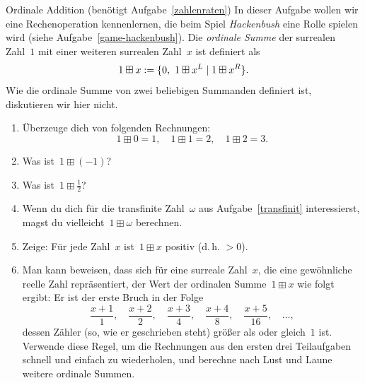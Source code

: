 \documentclass{zirkelblatt}
\begin{document}
\begin{aufgabe}{Ordinale Addition (benötigt Aufgabe~\ref{zahlenraten})}
\label{ordinale-addition}
In dieser Aufgabe wollen wir eine Rechenoperation
kennenlernen, die beim Spiel \emph{Hackenbush} eine Rolle spielen wird (siehe
Aufgabe~\ref{game-hackenbush}). Die \emph{ordinale Summe} der surrealen Zahl~$1$ mit
einer weiteren surrealen Zahl~$x$ ist definiert als
\[ 1 \boxplus x := \sur{0,\ 1 \boxplus x^L}{1 \boxplus x^R}. \]
Wie die ordinale Summe von zwei beliebigen Summanden definiert ist,
diskutieren wir hier nicht.
\begin{enumerate}
\item Überzeuge dich von folgenden Rechnungen:
\[ 1 \boxplus 0 = 1, \quad
  1 \boxplus 1 = 2, \quad
  1 \boxplus 2 = 3. \]
\item Was ist~$1 \boxplus (-1)$?
\item Was ist~$1 \boxplus \tfrac{1}{2}$?
\item Wenn du dich für die transfinite Zahl~$\omega$ aus
Aufgabe~\ref{transfinit} interessierst, magst du vielleicht~$1 \boxplus \omega$
berechnen.
\item Zeige: Für jede Zahl~$x$ ist~$1 \boxplus x$ positiv (d.\,h. $> 0$).
\item Man kann beweisen, dass sich für eine surreale Zahl~$x$, die eine gewöhnliche
reelle Zahl repräsentiert, der Wert der ordinalen Summe~$1 \boxplus x$ wie
folgt ergibt: Er ist der erste Bruch in der Folge
\[ \frac{x+1}{1}, \quad
  \frac{x+2}{2}, \quad
  \frac{x+3}{4}, \quad
  \frac{x+4}{8}, \quad
  \frac{x+5}{16}, \quad \ldots, \]
dessen Zähler (so, wie er geschrieben steht) größer als oder gleich~$1$ ist. Verwende diese
Regel, um die Rechnungen aus den ersten drei Teilaufgaben schnell und einfach
zu wiederholen, und berechne nach Lust und Laune weitere ordinale Summen.
\end{enumerate}
\end{aufgabe}
\end{document}
